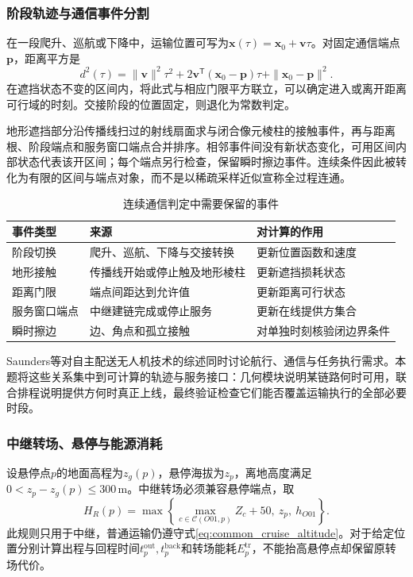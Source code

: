 \documentclass[withoutpreface,colorprint]{format}
\numberwithin{equation}{section}
\numberwithin{figure}{section}
\numberwithin{table}{section}
\begin{document}
\subsubsection{阶段轨迹与通信事件分割}
在一段爬升、巡航或下降中，运输位置可写为$\boldsymbol x(\tau)=\boldsymbol x_0+\boldsymbol v\tau$。对固定通信端点$\boldsymbol p$，距离平方是
\begin{equation}
 d^2(\tau)=\|\boldsymbol v\|^2\tau^2+2\boldsymbol v^{\mathsf T}(\boldsymbol x_0-\boldsymbol p)\tau+\|\boldsymbol x_0-\boldsymbol p\|^2.
 \label{eq:q3_distance_quadratic}
\end{equation}
在遮挡状态不变的区间内，将此式与相应门限平方联立，可以确定进入或离开距离可行域的时刻。交接阶段的位置固定，则退化为常数判定。

地形遮挡部分沿传播线扫过的射线扇面求与闭合像元棱柱的接触事件，再与距离根、阶段端点和服务窗口端点合并排序。相邻事件间没有新状态变化，可用区间内部状态代表该开区间；每个端点另行检查，保留瞬时擦边事件。连续条件因此被转化为有限的区间与端点对象，而不是以稀疏采样近似宣称全过程连通。

\begin{table}[htbp]\centering\small
\caption{连续通信判定中需要保留的事件}\label{tab:comm_events}
\begin{tabularx}{\linewidth}{p{2.8cm}LL}\toprule
事件类型 & 来源 & 对计算的作用\\\midrule
阶段切换 & 爬升、巡航、下降与交接转换 & 更新位置函数和速度\\
地形接触 & 传播线开始或停止触及地形棱柱 & 更新遮挡损耗状态\\
距离门限 & 端点间距达到允许值 & 更新距离可行状态\\
服务窗口端点 & 中继建链完成或停止服务 & 更新在线提供方集合\\
瞬时擦边 & 边、角点和孤立接触 & 对单独时刻核验闭边界条件\\\bottomrule
\end{tabularx}\end{table}

Saunders等对自主配送无人机技术的综述同时讨论航行、通信与任务执行需求\cite{saunders2024}。本题将这些关系集中到可计算的轨迹与服务接口：几何模块说明某链路何时可用，联合排程说明提供方何时真正上线，最终验证检查它们能否覆盖运输执行的全部必要时段。


\subsubsection{中继转场、悬停与能源消耗}
设悬停点$p$的地面高程为$z_g(p)$，悬停海拔为$z_p$，离地高度满足$0<z_p-z_g(p)\le300$\,m。中继转场必须兼容悬停端点，取
\begin{equation}
 H_R(p)=\max\left\{\max_{c\in\mathcal C(O01,p)}Z_c+50,\ z_p,\ h_{O01}\right\}.
\label{eq:q3_relay_height}
\end{equation}
此规则只用于中继，普通运输仍遵守式\eqref{eq:common_cruise_altitude}。对于给定位置分别计算出程与回程时间$t_p^{\mathrm{out}},t_p^{\mathrm{back}}$和转场能耗$E_p^{\mathrm{tr}}$，不能抬高悬停点却保留原转场代价。
\end{document}
